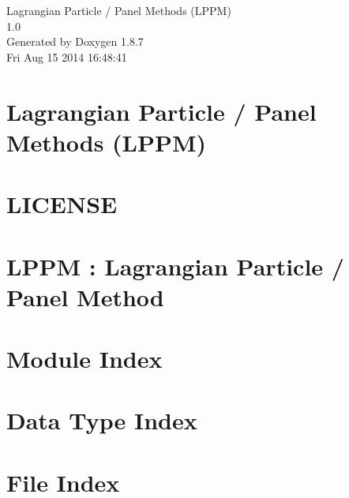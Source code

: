 \documentclass[twoside]{book}
\newcommand{\+}{\discretionary{\mbox{\scriptsize$\hookleftarrow$}}{}{}}
\newcommand{\clearemptydoublepage}{%
  \newpage{\pagestyle{empty}\cleardoublepage}%
}
\begin{document}
\hypersetup{pageanchor=false,
             bookmarks=true,
             bookmarksnumbered=true,
             pdfencoding=unicode
            }
\begin{titlepage}
\vspace*{7cm}
\begin{center}%
{\Large Lagrangian Particle / Panel Methods (L\+P\+P\+M) \\[1ex]\large 1.\+0 }\\
\vspace*{1cm}
{\large Generated by Doxygen 1.8.7}\\
\vspace*{0.5cm}
{\small Fri Aug 15 2014 16:48:41}\\
\end{center}
\end{titlepage}
\clearemptydoublepage
\tableofcontents
\clearemptydoublepage
{}
\hypersetup{pageanchor=true}

\chapter{Lagrangian Particle / Panel Methods (L\+P\+P\+M)}
\label{index}\hypertarget{index}{}
\chapter{L\+I\+C\+E\+N\+S\+E}
\label{md_LICENSE}
\hypertarget{md_LICENSE}{}

\chapter{L\+P\+P\+M \+: Lagrangian Particle / Panel Method}
\label{md_README}
\hypertarget{md_README}{}

\chapter{Module Index}

\chapter{Data Type Index}

\chapter{File Index}

\end{document}
